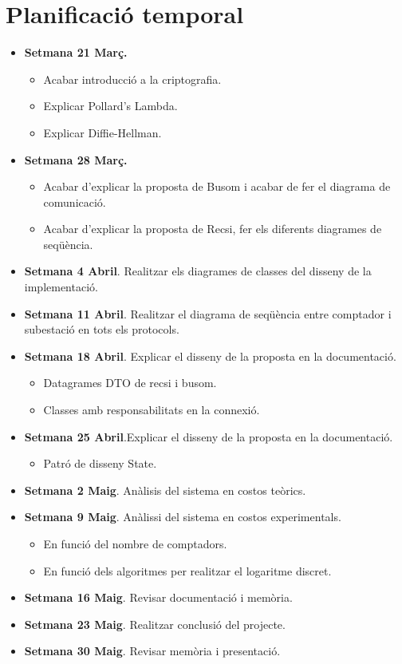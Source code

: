 \documentclass{article}
\begin{document}
	\section{Planificació temporal}
	\begin{itemize}
		\item \textbf{Setmana 21 Març.}
		\begin{itemize}
			\item Acabar introducció a la criptografia.
			\item Explicar Pollard's Lambda.
			\item Explicar Diffie-Hellman.
		\end{itemize}
		\item \textbf{Setmana 28 Març.} 
		\begin{itemize}
			\item Acabar d'explicar la proposta de Busom i acabar de fer el diagrama de comunicació. 
			\item Acabar d'explicar la proposta de Recsi, fer els diferents diagrames de seqüència.
		\end{itemize}
		\item \textbf{Setmana 4 Abril}. Realitzar els diagrames de classes del disseny de la implementació.
		\item \textbf{Setmana 11 Abril}. Realitzar el diagrama de seqüència entre comptador i subestació en tots els protocols.
		\item \textbf{Setmana 18 Abril}. Explicar el disseny de la proposta en la documentació.
		\begin{itemize}
			\item Datagrames DTO de recsi i busom.
			\item Classes amb responsabilitats en la connexió.
		\end{itemize}
		\item \textbf{Setmana 25 Abril}.Explicar el disseny de la proposta en la documentació.
		\begin{itemize}
			\item Patró de disseny State.
		\end{itemize}
		\item \textbf{Setmana 2 Maig}. Anàlisis del sistema en costos teòrics.
		\item \textbf{Setmana 9 Maig}. Anàlissi del sistema en costos experimentals.
		\begin{itemize}
			\item En funció del nombre de comptadors.
			\item En funció dels algoritmes per realitzar el logaritme discret.
		\end{itemize}
		\item \textbf{Setmana 16 Maig}. Revisar documentació i memòria.
		\item \textbf{Setmana 23 Maig}. Realitzar conclusió del projecte.
		\item \textbf{Setmana 30 Maig}. Revisar memòria i presentació.\textit{}
	\end{itemize}
	\nocite{*}
	
	
	
\end{document}
